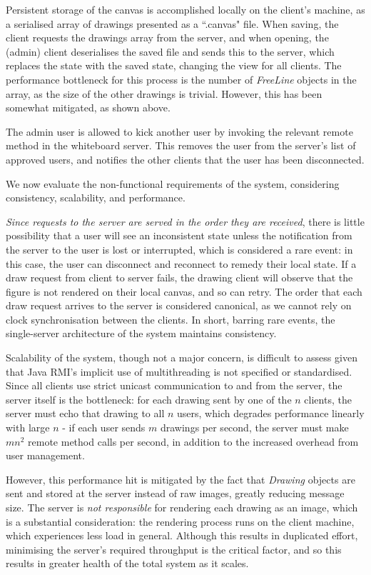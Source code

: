\documentclass[12pt,a4paper]{article}
\begin{document}
Persistent storage of the canvas is accomplished locally on the client's machine, as a serialised array of drawings presented as a ``.canvas" file. When saving, the client requests the drawings array from the server, and when opening, the (admin) client deserialises the saved file and sends this to the server, which replaces the state with the saved state, changing the view for all clients. The performance bottleneck for this process is the number of \textit{FreeLine} objects in the array, as the size of the other drawings is trivial. However, this has been somewhat mitigated, as shown above.

The admin user is allowed to kick another user by invoking the relevant remote method in the whiteboard server. This removes the user from the server's list of approved users, and notifies the other clients that the user has been disconnected.

We now evaluate the non-functional requirements of the system, considering consistency, scalability, and performance.

\textit{Since requests to the server are served in the order they are received}, there is little possibility that a user will see an inconsistent state unless the notification from the server to the user is lost or interrupted, which is considered a rare event: in this case, the user can disconnect and reconnect to remedy their local state. If a draw request from client to server fails, the drawing client will observe that the figure is not rendered on their local canvas, and so can retry. The order that each draw request arrives to the server is considered canonical, as we cannot rely on clock synchronisation between the clients. In short, barring rare events, the single-server architecture of the system maintains consistency. 

Scalability of the system, though not a major concern, is difficult to assess given that Java RMI's implicit use of multithreading is not specified or standardised. Since all clients use strict unicast communication to and from the server, the server itself is the bottleneck: for each drawing sent by one of the $n$ clients, the server must echo that drawing to all $n$ users, which degrades performance linearly with large $n$ - if each user sends $m$ drawings per second, the server must make $mn^2$ remote method calls per second, in addition to the increased overhead from user management. 

However, this performance hit is mitigated by the fact that \textit{Drawing} objects are sent and stored at the server instead of raw images, greatly reducing message size. The server is \textit{not responsible} for rendering each drawing as an image, which is a substantial consideration: the rendering process runs on the client machine, which experiences less load in general. Although this results in duplicated effort, minimising the server's required throughput is the critical factor, and so this results in greater health of the total system as it scales. 
\end{document}
